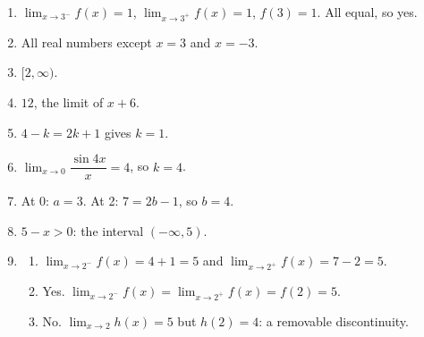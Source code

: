\documentclass[11pt]{article}
\begin{document}
\newpage
\begin{solbox}
\begin{enumerate}[leftmargin=*,itemsep=4pt]
  \item $\displaystyle\lim_{x\to 3^-}f(x)=1$, $\displaystyle\lim_{x\to 3^+}f(x)=1$, $f(3)=1$. All equal, so yes.
  \item All real numbers except $x=3$ and $x=-3$.
  \item $[2,\infty)$.
  \item $12$, the limit of $x+6$.
  \item $4-k=2k+1$ gives $k=1$.
  \item $\displaystyle\lim_{x\to 0}\dfrac{\sin4x}{x}=4$, so $k=4$.
  \item At 0: $a=3$. At 2: $7=2b-1$, so $b=4$.
  \item $5-x>0$: the interval $(-\infty,5)$.
  \item \begin{enumerate}[label=(\alph*),leftmargin=*,itemsep=3pt]
    \item $\displaystyle\lim_{x\to 2^-}f(x)=4+1=5$ and $\displaystyle\lim_{x\to 2^+}f(x)=7-2=5$.
    \item Yes. $\displaystyle\lim_{x\to 2^-}f(x)=\displaystyle\lim_{x\to 2^+}f(x)=f(2)=5$.
    \item No. $\displaystyle\lim_{x\to 2}h(x)=5$ but $h(2)=4$: a removable discontinuity.
  \end{enumerate}
\end{enumerate}
\end{solbox}
\end{document}
